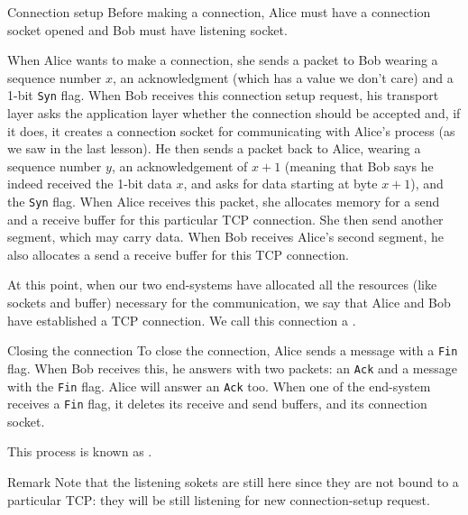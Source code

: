 \documentclass[a4paper]{article}
\begin{document}
\begin{parag}{Connection setup}
    Before making a connection, Alice must have a connection socket opened and Bob must have listening socket.

    When Alice wants to make a connection, she sends a packet to Bob wearing a sequence number $x$, an acknowledgment (which has a value we don't care) and a 1-bit \texttt{Syn} flag. When Bob receives this connection setup request, his transport layer asks the application layer whether the connection should be accepted and, if it does, it creates a connection socket for communicating with Alice's process (as we saw in the last lesson). He then sends a packet back to Alice, wearing a sequence number $y$, an acknowledgement of $x+1$ (meaning that Bob says he indeed received the 1-bit data $x$, and asks for data starting at byte $x+1$), and the \texttt{Syn} flag. When Alice receives this packet, she allocates memory for a send and a receive buffer for this particular TCP connection. She then send another segment, which may carry data. When Bob receives Alice's second segment, he also allocates a send a receive buffer for this TCP connection.

    At this point, when our two end-systems have allocated all the resources (like sockets and buffer) necessary for the communication, we say that Alice and Bob have established a TCP connection. We call this connection a .

\end{parag}

\begin{parag}{Closing the connection}
    To close the connection, Alice sends a message with a \texttt{Fin} flag. When Bob receives this, he answers with two packets: an \texttt{Ack} and a message with the \texttt{Fin} flag. Alice will answer an \texttt{Ack} too. When one of the end-system receives a \texttt{Fin} flag, it deletes its receive and send buffers, and its connection socket.


    This process is known as .

    \begin{subparag}{Remark}
        Note that the listening sokets are still here since they are not bound to a particular TCP: they will be still listening for new connection-setup request.
    \end{subparag}
\end{parag}
\end{document}
